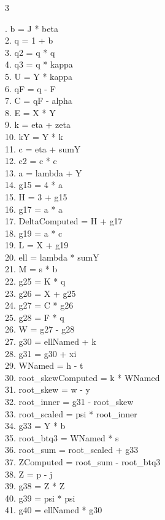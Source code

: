 \documentclass[10pt]{article}
\begin{document}
\begin{multicols}{3}
\raggedright\ttfamily\fontsize{6.2}{7.1}. b = J * beta\\
2. q = 1 + b\\
3. q2 = q * q\\
4. q3 = q * kappa\\
5. U = Y * kappa\\
6. qF = q - F\\
7. C = qF - alpha\\
8. E = X * Y\\
9. k = eta + zeta\\
10. kY = Y * k\\
11. c = eta + sumY\\
12. c2 = c * c\\
13. a = lambda + Y\\
14. g15 = 4 * a\\
15. H = 3 + g15\\
16. g17 = a * a\\
17. DeltaComputed = H + g17\\
18. g19 = a * c\\
19. L = X + g19\\
20. ell = lambda * sumY\\
21. M = s * b\\
22. g25 = K * q\\
23. g26 = X + g25\\
24. g27 = C * g26\\
25. g28 = F * q\\
26. W = g27 - g28\\
27. g30 = ellNamed + k\\
28. g31 = g30 + xi\\
29. WNamed = h - t\\
30. root\_skewComputed = k * WNamed\\
31. root\_skew = w - y\\
32. root\_inner = g31 - root\_skew\\
33. root\_scaled = psi * root\_inner\\
34. g33 = Y * b\\
35. root\_btq3 = WNamed * s\\
36. root\_sum = root\_scaled + g33\\
37. ZComputed = root\_sum - root\_btq3\\
38. Z = p - j\\
39. g38 = Z * Z\\
40. g39 = psi * psi\\
41. g40 = ellNamed * g30\\

\end{multicols}
\end{document}
